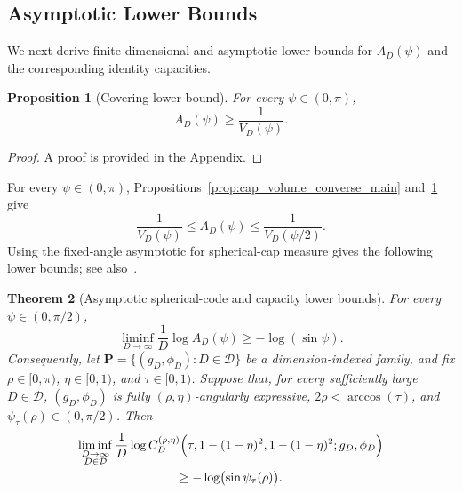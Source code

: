 \documentclass[journal]{IEEEtran}
\def\D{\mathrm{D}} %
\newtheorem{theorem}{Theorem}
\newtheorem{proposition}[theorem]{Proposition}
\begin{document}
\begin{bibunit}
 

\subsection{Asymptotic Lower Bounds}
\label{subsec:asymptotic_growth_main}

We next derive finite-dimensional and asymptotic lower bounds for $A_D(\psi)$ and the corresponding identity capacities.

\begin{proposition}[Covering lower bound]
\label{prop:covering_lower_bound_main}
%
For every $\psi\in(0,\pi)$,
%
\begin{equation}
A_D(\psi)\ge \frac{1}{V_D(\psi)}.
\label{eq:covering_lower_bound_main}
\end{equation}
%
\end{proposition}

\begin{proof}
A proof is provided in the Appendix.
\end{proof}

For every $\psi\in(0,\pi)$, Propositions~\ref{prop:cap_volume_converse_main} and~\ref{prop:covering_lower_bound_main} give
%
\begin{equation}
\frac{1}{V_D(\psi)} \le A_D(\psi)
\le \frac{1}{V_D(\psi/2)}.
\label{eq:packing_sandwich_main}
\end{equation}
%
Using the fixed-angle asymptotic for spherical-cap measure gives the following lower bounds; see also~\cite{kabatiansky1978bounds}.


\begin{theorem}[Asymptotic spherical-code and capacity lower bounds]
\label{thm:asymptotic_lower_bound_main}
%
For every $\psi\in(0,\pi/2)$,
%
\begin{equation}
\liminf_{D\to\infty} \frac{1}{D}\log A_D(\psi) \ge -\log(\sin\psi).
\label{eq:spherical_code_rate_lower_main}
\end{equation}
%
Consequently, let $\mathbf P=\{(g_D,\phi_D):D\in\mathcal D\}$ be a dimension-indexed family, and fix $\rho\in[0,\pi)$, $\eta\in[0,1)$, and $\tau\in[0,1)$. Suppose that, for every sufficiently large $D\in\mathcal D$, $(g_D,\phi_D)$ is fully $(\rho,\eta)$-angularly expressive, $2\rho<\arccos(\tau)$, and
$\psi_\tau(\rho)\in(0,\pi/2)$. Then
%
\begin{multline}
\liminf_{\substack{D\to\infty\\D\in\mathcal D}} \frac{1}{D}\log
C_D^{(\rho,\eta)}\Bigl(\tau,1-(1-\eta)^2,  1-(1-\eta)^2;g_D,\phi_D\Bigr) \\
 \ge -\log \bigl(\sin\psi_\tau(\rho)\bigr).
\label{eq:restricted_capacity_rate_lower_main}
\end{multline}
%
\end{theorem}


\end{bibunit}
\end{document}
